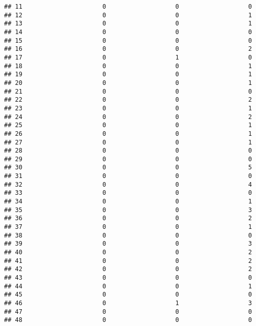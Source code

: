 \documentclass[
]{article}
\begin{document}
\begin{verbatim}
## 11                      0                   0                   0
## 12                      0                   0                   1
## 13                      0                   0                   1
## 14                      0                   0                   0
## 15                      0                   0                   0
## 16                      0                   0                   2
## 17                      0                   1                   0
## 18                      0                   0                   1
## 19                      0                   0                   1
## 20                      0                   0                   1
## 21                      0                   0                   0
## 22                      0                   0                   2
## 23                      0                   0                   1
## 24                      0                   0                   2
## 25                      0                   0                   1
## 26                      0                   0                   1
## 27                      0                   0                   1
## 28                      0                   0                   0
## 29                      0                   0                   0
## 30                      0                   0                   5
## 31                      0                   0                   0
## 32                      0                   0                   4
## 33                      0                   0                   0
## 34                      0                   0                   1
## 35                      0                   0                   3
## 36                      0                   0                   2
## 37                      0                   0                   1
## 38                      0                   0                   0
## 39                      0                   0                   3
## 40                      0                   0                   2
## 41                      0                   0                   2
## 42                      0                   0                   2
## 43                      0                   0                   0
## 44                      0                   0                   1
## 45                      0                   0                   0
## 46                      0                   1                   3
## 47                      0                   0                   0
## 48                      0                   0                   0

\end{verbatim}
\end{document}
